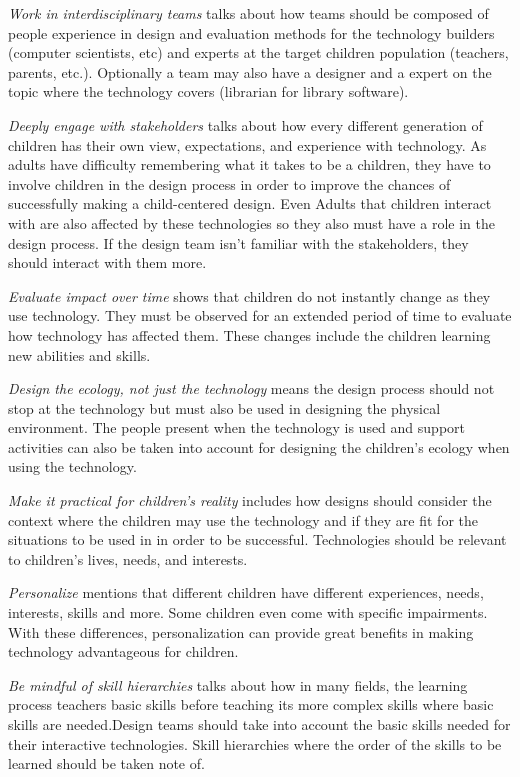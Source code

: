 \textit{Work in interdisciplinary teams} talks about how teams should be composed of people experience in design and evaluation methods for the technology builders (computer scientists, etc) and experts at the target children population (teachers, parents, etc.). Optionally a team may also have a designer and a expert on the topic where the technology covers (librarian for library software).

\textit{Deeply engage with stakeholders} talks about how every different generation of children has their own view, expectations, and experience with technology. As adults have difficulty remembering what it takes to be a children, they have to involve children in the design process in order to improve the chances of successfully making a child-centered design.  Even Adults that children interact with are also affected by these technologies so they also must have a role in the design process. If the design team isn't familiar with the stakeholders, they should interact with them more.

\textit{Evaluate impact over time} shows that children do not instantly change as they use technology. They must be observed for an extended period of time to evaluate how technology has affected them. These changes include the children learning new abilities and skills.

\textit{Design the ecology, not just the technology} means the design process should not stop at the technology but must also be used in designing the physical environment. The people present when the technology is used and support activities can also be taken into account for designing the children's ecology when using the technology.

\textit{Make it practical for children’s reality} includes how designs should consider the context where the children may use the technology and if they are fit for the situations to be used in in order to be successful. Technologies should be relevant to children’s lives, needs, and interests.

\textit{Personalize} mentions that different children have different experiences, needs, interests, skills and more. Some children even come with specific impairments.  With these differences, personalization can provide great benefits in making technology advantageous for children.

\textit{Be mindful of skill hierarchies} talks about how in many fields, the learning process teachers basic skills before teaching its more complex skills where basic skills are needed.Design teams should take into account the basic skills needed for their interactive technologies. Skill hierarchies where the order of the skills to be learned should be taken note of.


